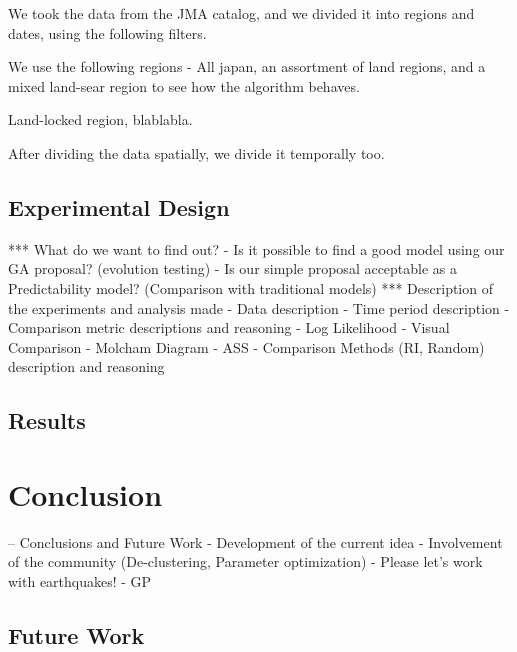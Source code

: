 \documentclass{sig-alternate}
\begin{document}
We took the data from the JMA catalog, and we divided it into regions
and dates, using the following filters.

We use the following regions - All japan, an assortment of land
regions, and a mixed land-sear region to see how the algorithm
behaves.

Land-locked region, blablabla.

After dividing the data spatially, we divide it temporally too.


\subsection{Experimental Design}

*** What do we want to find out?
    - Is it possible to find a good model using our GA proposal?
      (evolution testing)
    - Is our simple proposal acceptable as a Predictability model?
      (Comparison with traditional models)
*** Description of the experiments and analysis made
    - Data description
    - Time period description
    - Comparison metric descriptions and reasoning
      - Log Likelihood
      - Visual Comparison
      - Molcham Diagram
      - ASS
    - Comparison Methods (RI, Random) description and reasoning

\subsection{Results}

\section{Conclusion}
-- Conclusions and Future Work
   - Development of the current idea
   - Involvement of the community (De-clustering, Parameter optimization)
   - Please let's work with earthquakes!
   - GP
\subsection{Future Work}





\end{document}
